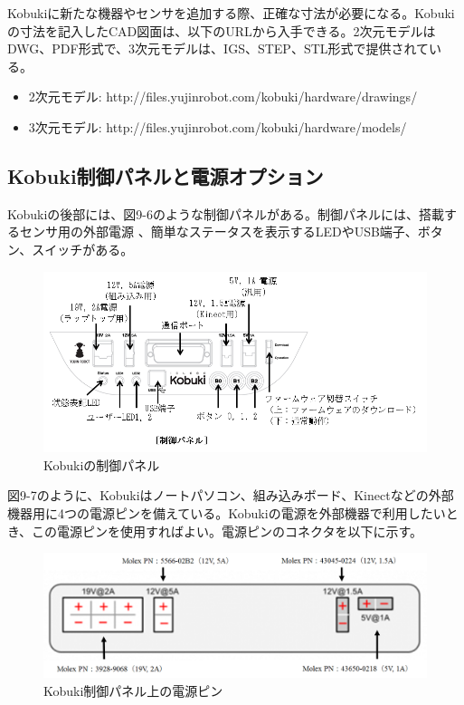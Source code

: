 \begin{exercise}[KobukiのCAD図面の入手方法]
  Kobukiに新たな機器やセンサを追加する際、正確な寸法が必要になる。Kobukiの寸法を記入したCAD図面は、以下のURLから入手できる。2次元モデルはDWG、PDF形式で、3次元モデルは、IGS、STEP、STL形式で提供されている。
  \begin{itemize}
    \item  2次元モデル:  http://files.yujinrobot.com/kobuki/hardware/drawings/
    \item  3次元モデル:  http://files.yujinrobot.com/kobuki/hardware/models/
  \end{itemize}
\end{exercise}

\subsection{Kobuki制御パネルと電源オプション}

Kobukiの後部には、図9-6のような制御パネルがある。制御パネルには、搭載するセンサ用の外部電源  、簡単なステータスを表示するLEDやUSB端子、ボタン、スイッチがある。

\begin{figure}[ht]
  \centering
  \includegraphics[width=\columnwidth]{pictures/chapter9/pic_09_06.png}
  \caption{Kobukiの制御パネル}
\end{figure}

図9-7のように、Kobukiはノートパソコン、組み込みボード、Kinectなどの外部機器用に4つの電源ピンを備えている。Kobukiの電源を外部機器で利用したいとき、この電源ピンを使用すればよい。電源ピンのコネクタを以下に示す。

\begin{figure}[ht]
  \centering
  \includegraphics[width=\columnwidth]{pictures/chapter9/pic_09_07.png}
  \caption{Kobuki制御パネル上の電源ピン}
\end{figure}

